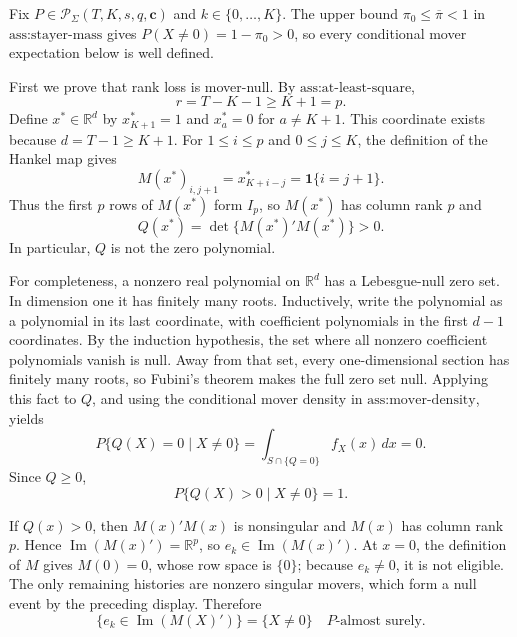 Fix \(P\in\mathcal P_\Sigma(T,K,s,q,\mathbf c)\) and \(k\in\{0,\ldots,K\}\). The upper bound \(\pi_0\le\overline\pi<1\) in \(\text{ass:stayer-mass}\) gives \(P(X\ne0)=1-\pi_0>0\), so every conditional mover expectation below is well defined.

First we prove that rank loss is mover-null. By \(\text{ass:at-least-square}\),
\[
r=T-K-1\ge K+1=p.
\]
Define \(x^*\in\mathbb R^d\) by \(x^*_{K+1}=1\) and \(x^*_a=0\) for \(a\ne K+1\). This coordinate exists because \(d=T-1\ge K+1\). For \(1\le i\le p\) and \(0\le j\le K\), the definition of the Hankel map gives
\[
M(x^*)_{i,j+1}=x^*_{K+i-j}=\mathbf 1\{i=j+1\}.
\]
Thus the first \(p\) rows of \(M(x^*)\) form \(I_p\), so \(M(x^*)\) has column rank \(p\) and
\[
Q(x^*)=\det\{M(x^*)'M(x^*)\}>0.
\]
In particular, \(Q\) is not the zero polynomial.

For completeness, a nonzero real polynomial on \(\mathbb R^d\) has a Lebesgue-null zero set. In dimension one it has finitely many roots. Inductively, write the polynomial as a polynomial in its last coordinate, with coefficient polynomials in the first \(d-1\) coordinates. By the induction hypothesis, the set where all nonzero coefficient polynomials vanish is null. Away from that set, every one-dimensional section has finitely many roots, so Fubini's theorem makes the full zero set null. Applying this fact to \(Q\), and using the conditional mover density in \(\text{ass:mover-density}\), yields
\[
P\{Q(X)=0\mid X\ne0\}
=\int_{S\cap\{Q=0\}}f_X(x)\,dx=0.
\]
Since \(Q\ge0\),
\[
P\{Q(X)>0\mid X\ne0\}=1.
\]

If \(Q(x)>0\), then \(M(x)'M(x)\) is nonsingular and \(M(x)\) has column rank \(p\). Hence \(\operatorname{Im}(M(x)')=\mathbb R^p\), so \(e_k\in\operatorname{Im}(M(x)')\). At \(x=0\), the definition of \(M\) gives \(M(0)=0\), whose row space is \(\{0\}\); because \(e_k\ne0\), it is not eligible. The only remaining histories are nonzero singular movers, which form a null event by the preceding display. Therefore
\[
\{e_k\in\operatorname{Im}(M(X)')\}
=\{X\ne0\}
\quad P\text{-almost surely}.
\]

